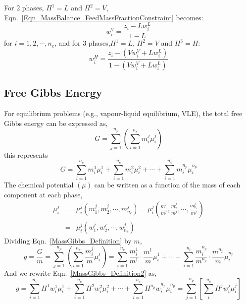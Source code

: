 \documentclass[12pts,a4paper,amsmath,amssymb,floatfix]{article}%
\newcommand{\frc}{\displaystyle\frac}
\newcommand{\summation}{\sum\limits}
\begin{document}
\begin{mdframed}[style=JFrame]
For 2 phases, $\Pi^{1}=L$ and $\Pi^{2}=V$, Eqn.~\ref{Eqn_MassBalance_FeedMassFractionConstraint} becomes:
\begin{displaymath}
w_{i}^{V} = \frc{z_{i}-Lw_{i}^{L}}{1-L}
\end{displaymath}
for $i=1,2,\cdots,n_{c}$, and for 3 phases,$\Pi^{1}=L$, $\Pi^{2}=V$ and $\Pi^{3}=H$:
\begin{displaymath}
w_{i}^{H} = \frc{z_{i}-\left(V w_{i}^{V} + L w_{i}^{L}\right)}{1 - \left(V w_{i}^{V} + L w_{i}^{L}\right)}
\end{displaymath}
\end{mdframed}

\subsection{Free Gibbs Energy}
For equilibrium problems (e.g., vapour-liquid equilibrium, VLE), the total free Gibbs energy can be expressed as,
\begin{equation}
G = \summation_{j=1}^{n_{p}}\left(\summation_{i=1}^{n_{c}} m_{i}^{j}\mu_{i}^{j}\right)
\label{MassGibbs_Definition}
\end{equation} 
this represents
\begin{displaymath}
G = \summation_{i=1}^{n_{c}} m_{i}^{1}\mu_{i}^{1} + \summation_{i=1}^{n_{c}} m_{i}^{2}\mu_{i}^{2} + \cdots + \summation_{i=1}^{n_{c}} m_{i}^{n_{p}}\mu_{i}^{n_{p}}
\end{displaymath}
The chemical potential $\left(\mu\right)$ can be written as a function of the mass of each component at each phase,
\begin{eqnarray}
\mu_{i}^{j} &=& \mu_{i}^{j}\left(m_{1}^{j}, m_{2}^{j}, \cdots, m_{n_{c}}^{j}\right) = \mu_{i}^{j}\left(\frc{m_{1}^{j}}{m^{j}}, \frc{m_{2}^{j}}{m^{j}}, \cdots, \frc{m_{n_{c}}^{j}}{m^{j}}\right)\nonumber \\
 &=& \mu_{i}^{j}\left(w_{1}^{j}, w_{2}^{j}, \cdots, w_{n_{c}}^{j}\right)\label{chempotential_functional}
\end{eqnarray}
Dividing Eqn.~\ref{MassGibbs_Definition} by $m$,
\begin{equation}
g = \frc{G}{m} = \summation_{j=1}^{n_{p}}\left(\summation_{i=1}^{n_{c}}\frc{m_{i}^{j}}{m}\mu_{i}^{j}\right) = \summation_{i=1}^{n_{c}}\frc{m_{i}^{1}}{m^{1}} \cdot \frc{m^{1}}{m} \mu_{i}^{1} + \cdots + \summation_{i=1}^{n_{c}}\frc{m_{i}^{n_{p}}}{m^{n_{p}}} \cdot \frc{m^{n_{p}}}{m} \mu_{i}^{n_{p}}
\label{MassGibbs_Definition2}
\end{equation}
And we rewrite Eqn.~\ref{MassGibbs_Definition2} as,
\begin{equation}
g = \summation_{i=1}^{n_{c}}\Pi^{1}w_{i}^{1}\mu_{i}^{1} + \summation_{i=1}^{n_{c}}\Pi^{2}w_{i}^{2}\mu_{i}^{2} + \cdots + \summation_{i=1}^{n_{c}}\Pi^{n_{p}}w_{i}^{n_{p}}\mu_{i}^{n_{p}} = \summation_{j=1}^{n_{p}}\left[\summation_{i}^{n_{c}}\Pi^{j}w_{i}^{j}\mu_{i}^{j}\right] \label{MassGibbs_Definition3}
\end{equation}
\end{document}
